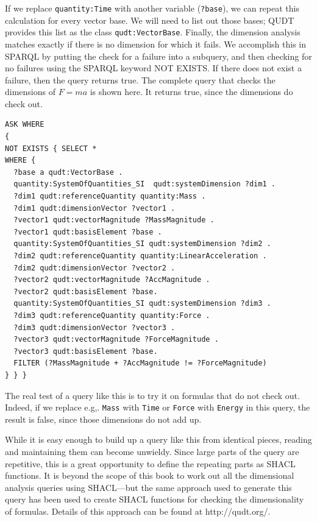 If we replace \texttt{quantity:Time} with another 
variable (\texttt{?base}), we can repeat
this calculation for every vector base. We will need to list out those
bases; QUDT provides this list as the class \texttt{qudt:VectorBase}. Finally,
the dimension analysis matches exactly if there is no dimension for
which it fails. We accomplish this in SPARQL by putting the check for a
failure into a subquery, and then checking for no failures using the
SPARQL keyword NOT EXISTS. If there does not exist a failure, then the
query returns true. The complete query that checks the dimensions 
of $F = ma$ is shown here. It returns true, since the dimensions do check out.

\begin{lstlisting}
ASK WHERE
{
NOT EXISTS { SELECT *
WHERE { 
  ?base a qudt:VectorBase .
  quantity:SystemOfQuantities_SI  qudt:systemDimension ?dim1 .
  ?dim1 qudt:referenceQuantity quantity:Mass .
  ?dim1 qudt:dimensionVector ?vector1 .
  ?vector1 qudt:vectorMagnitude ?MassMagnitude .
  ?vector1 qudt:basisElement ?base .
  quantity:SystemOfQuantities_SI qudt:systemDimension ?dim2 .
  ?dim2 qudt:referenceQuantity quantity:LinearAcceleration .
  ?dim2 qudt:dimensionVector ?vector2 .
  ?vector2 qudt:vectorMagnitude ?AccMagnitude .
  ?vector2 qudt:basisElement ?base.
  quantity:SystemOfQuantities_SI qudt:systemDimension ?dim3 .
  ?dim3 qudt:referenceQuantity quantity:Force .
  ?dim3 qudt:dimensionVector ?vector3 .
  ?vector3 qudt:vectorMagnitude ?ForceMagnitude .
  ?vector3 qudt:basisElement ?base.
  FILTER (?MassMagnitude + ?AccMagnitude != ?ForceMagnitude)
} } }
\end{lstlisting}

The real test of a query like this is to try it on formulas that do not
check out. Indeed, if we replace e.g,. \texttt{Mass} 
with \texttt{Time} or \texttt{Force} with
\texttt{Energy} in this query, the result is false, since those dimensions do not
add up.

While it is easy enough to build up a query like this from identical
pieces, reading and maintaining them can become unwieldy. Since large
parts of the query are repetitive, this is a great opportunity to define
the repeating parts as SHACL functions. It is beyond the scope of this
book to work out all the dimensional analysis queries using SHACL---but
the same approach used to generate this query has been used to create
SHACL functions for checking the dimensionality of formulas. Details of
this approach can be found at http://qudt.org/.

